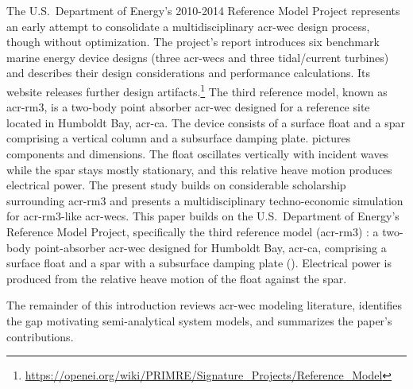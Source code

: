 \ifdefined\DISSERTATION
    The U.S.\ Department of Energy's 2010-2014 Reference Model Project \citep{RM3} represents an early attempt to consolidate a multidisciplinary \gls{acr-wec} design process, though without optimization.
    The project's report \citep{RM3} introduces six benchmark marine energy device designs (three \glspl{acr-wec} and three tidal/current turbines) and describes their design considerations and performance calculations.
    Its website releases further design artifacts.\footnote{\url{https://openei.org/wiki/PRIMRE/Signature_Projects/Reference_Model}} 
    The third reference model, known as \acrshort{acr-rm3}, is a two-body point absorber \gls{acr-wec} designed for a reference site located in Humboldt Bay, \gls{acr-ca}.
    The device consists of a surface float and a spar comprising a vertical column and a subsurface damping plate.
     pictures components and dimensions.
    The float oscillates vertically with incident waves while the spar stays mostly stationary, and this relative heave motion produces electrical power.
    The present study builds on considerable scholarship surrounding \gls{acr-rm3} and presents a multidisciplinary techno-economic simulation for \gls{acr-rm3}-like \glspl{acr-wec}.
\else
    This paper builds on the U.S.\ Department of Energy's Reference Model Project, specifically the third reference model (\acrshort{acr-rm3}) \citep{RM3}: a two-body point-absorber \gls{acr-wec} designed for Humboldt Bay, \gls{acr-ca}, comprising a surface float and a spar with a subsurface damping plate ().
    Electrical power is produced from the relative heave motion of the float against the spar.
\fi

The remainder of this introduction reviews \gls{acr-wec} modeling literature, identifies the gap motivating semi-analytical system models, and summarizes the paper's contributions.

